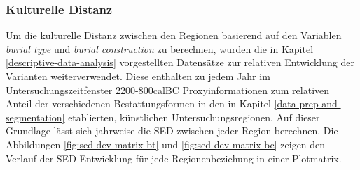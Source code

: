 \documentclass[openany,twoside,twocolumn]{book}
\begin{document}
\hypertarget{kulturelle-distanz}{%
\subsubsection{Kulturelle Distanz}\label{kulturelle-distanz}}

Um die kulturelle Distanz zwischen den Regionen basierend auf den
Variablen \emph{burial type} und \emph{burial construction} zu
berechnen, wurden die in Kapitel \ref{descriptive-data-analysis}
vorgestellten Datensätze zur relativen Entwicklung der Varianten
weiterverwendet. Diese enthalten zu jedem Jahr im
Untersuchungszeitfenster 2200-800calBC Proxyinformationen zum relativen
Anteil der verschiedenen Bestattungsformen in den in Kapitel
\ref{data-prep-and-segmentation} etablierten, künstlichen
Untersuchungsregionen. Auf dieser Grundlage lässt sich jahrweise die SED
zwischen jeder Region berechnen. Die Abbildungen
\ref{fig:sed-dev-matrix-bt} und \ref{fig:sed-dev-matrix-bc} zeigen den
Verlauf der SED-Entwicklung für jede Regionenbeziehung in einer
Plotmatrix.
\end{document}
